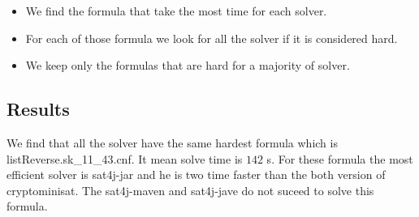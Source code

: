 \documentclass{article}
\begin{document}
\vskip 3mm

\begin{itemize}
\item We find the formula that take the most time for each solver.
\item For each of those formula we look for all the solver if it is considered hard.
\item We keep only the formulas that are hard for a majority of solver. 
\end{itemize}
\subsection{Results}

We find that all the solver have the same hardest formula which is listReverse.sk\_11\_43.cnf. It mean solve time is $142 $ s. 
For these formula the most efficient solver is sat4j-jar and he is two time faster than the both version of cryptominisat. The sat4j-maven and sat4j-jave do not suceed to solve this formula. 
\end{document}
